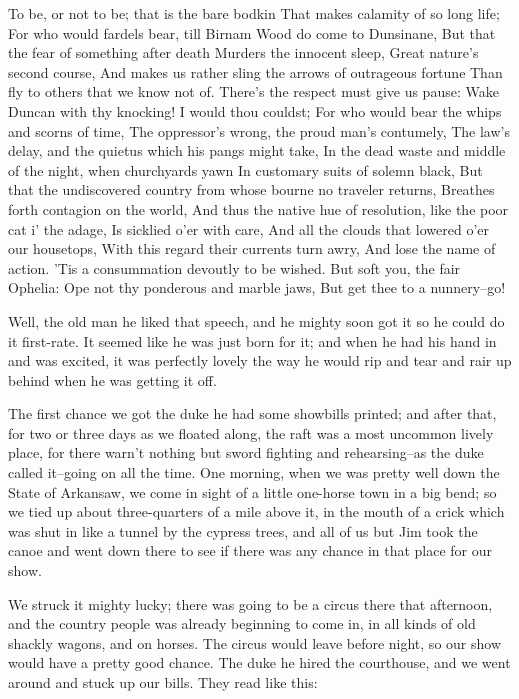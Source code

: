 To be, or not to be; that is the bare bodkin That makes calamity of so
long life; For who would fardels bear, till Birnam Wood do come to
Dunsinane, But that the fear of something after death Murders the
innocent sleep, Great nature's second course, And makes us rather sling
the arrows of outrageous fortune Than fly to others that we know not of.
There's the respect must give us pause: Wake Duncan with thy knocking!  I
would thou couldst; For who would bear the whips and scorns of time, The
oppressor's wrong, the proud man's contumely, The law's delay, and the
quietus which his pangs might take, In the dead waste and middle of the
night, when churchyards yawn In customary suits of solemn black, But that
the undiscovered country from whose bourne no traveler returns, Breathes
forth contagion on the world, And thus the native hue of resolution, like
the poor cat i' the adage, Is sicklied o'er with care, And all the clouds
that lowered o'er our housetops, With this regard their currents turn
awry, And lose the name of action. 'Tis a consummation devoutly to be
wished.  But soft you, the fair Ophelia: Ope not thy ponderous and marble
jaws, But get thee to a nunnery--go!

Well, the old man he liked that speech, and he mighty soon got it so he
could do it first-rate.  It seemed like he was just born for it; and when
he had his hand in and was excited, it was perfectly lovely the way he
would rip and tear and rair up behind when he was getting it off.

The first chance we got the duke he had some showbills printed; and after
that, for two or three days as we floated along, the raft was a most
uncommon lively place, for there warn't nothing but sword fighting and
rehearsing--as the duke called it--going on all the time.  One morning,
when we was pretty well down the State of Arkansaw, we come in sight of a
little one-horse town in a big bend; so we tied up about three-quarters
of a mile above it, in the mouth of a crick which was shut in like a
tunnel by the cypress trees, and all of us but Jim took the canoe and
went down there to see if there was any chance in that place for our
show.

We struck it mighty lucky; there was going to be a circus there that
afternoon, and the country people was already beginning to come in, in
all kinds of old shackly wagons, and on horses.  The circus would leave
before night, so our show would have a pretty good chance.  The duke he
hired the courthouse, and we went around and stuck up our bills.  They
read like this:

